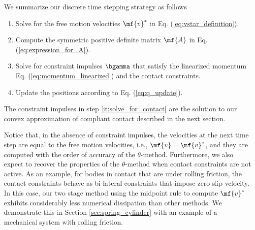 We summarize our discrete time stepping strategy as follows
\begin{enumerate}
	\item Solve for the free motion velocities $\mf{v}^*$ in Eq.
	(\ref{eq:vstar_definition}).
	\item Compute the symmetric positive definite matrix $\mf{A}$ in Eq.
	(\ref{eq:expression_for_A}).
	\item\label{it:solve_for_contact} Solve for constraint impulses $\bgamma$
	that satisfy the linearized momentum Eq. (\ref{eq:momentum_linearized}) and
	the contact constraints. 
	\item Update the positions according to Eq. (\ref{eq:q_update}).
\end{enumerate}

The constraint impulses in step \ref{it:solve_for_contact} are the solution to
our convex approximation of compliant contact described in the next section.

Notice that, in the absence of constraint impulses, the velocities at the next
time step are equal to the free motion velocities, i.e., $\mf{v}=\mf{v}^*$, and
they are computed with the order of accuracy of the $\theta\text{-method}$.
Furthermore, we also expect to recover the properties of the
$\theta\text{-method}$ when contact constraints are not active. As an example,
for bodies in contact that are under rolling friction, the contact constraints
behave as bi-lateral constraints that impose zero slip velocity. In this case,
our two stage method using the midpoint rule to compute $\mf{v}^*$ exhibits
considerably less numerical dissipation than other methods. We demonstrate this
in Section \ref{sec:spring_cylinder} with an example of a mechanical system with
rolling friction.
